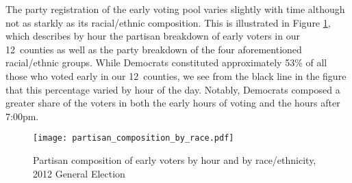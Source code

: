\documentclass[12pt,titlepage]{article}
\newcommand{\numcounties}{12}
\begin{document}




The party registration of the early voting pool varies slightly with
time although not as starkly as its racial/ethnic composition.  This
is illustrated in Figure \ref{fig:party2012}, which describes by hour
the partisan breakdown of early voters in our \numcounties\ counties
as well as the party breakdown of the four aforementioned
racial/ethnic groups.  While Democrats constituted approximately 53\%
of all those who voted early in our \numcounties\ counties, we see
from the black line in the figure that this percentage varied by hour
of the day.  Notably, Democrats composed a greater share of the voters
in both the early hours of voting and the hours after 7:00pm.


\begin{figure}[!ht]
\caption{Partisan composition of early voters by hour and by race/ethnicity, 2012
  General Election}
  \label{fig:party2012}
  \centering
    \centering\texttt{[image: partisan\_composition\_by\_race.pdf]}
\end{figure}


\end{document}
